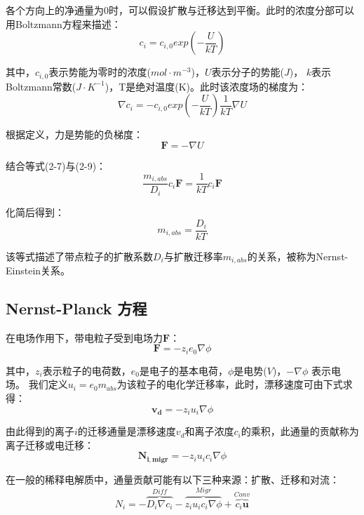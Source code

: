 各个方向上的净通量为$0$时，可以假设扩散与迁移达到平衡。此时的浓度分部可以用Boltzmann方程来描述：
\begin{equation}
    c_i=c_{i,0}exp(-\frac{U}{kT})
\end{equation}

其中，$c_{i,0}$表示势能为零时的浓度($mol\cdot{m^{-3}}$)，$U$表示分子的势能($J$)，
$k$表示Boltzmann常数($J\cdot{K^{-1}}$)，T是绝对温度(K)。此时该浓度场的梯度为：
\begin{equation}
    \nabla{c_i}=-c_{i,0}exp(-\frac{U}{kT})\frac{1}{kT}\nabla{U}
\end{equation}

根据定义，力是势能的负梯度：
\begin{equation}
    \mathbf{F}=-\nabla{U}
\end{equation}

结合等式(2-7)与(2-9)：
\begin{equation}
    \frac{m_{i,abs}}{D_i}c_i\mathbf{F}=\frac{1}{kT}c_i\mathbf{F}
\end{equation}

化简后得到：
\begin{equation}
    m_{i,abs}=\frac{D_i}{kT}
\end{equation}

该等式描述了带点粒子的扩散系数$D_i$与扩散迁移率$m_{i,abs}$的关系，被称为Nernst-Einstein关系。\cite{Mehrer2007,CONWAY1972250}
\subsection{Nernst-Planck 方程}
在电场作用下，带电粒子受到电场力$\mathbf{F}$：
\begin{equation}
    \mathbf{F}=-z_ie_0\nabla\phi
\end{equation}

其中，$z_i$表示粒子的电荷数，$e_0$是电子的基本电荷，$\phi$是电势($V$)，$−\nabla{\phi}$ 表示电场。
我们定义$u_i=e_0m_{abs}$为该粒子的电化学迁移率，此时，漂移速度可由下式求得：
\begin{equation}
   \mathbf{v_d}=-z_iu_i\nabla\phi
\end{equation}

由此得到的离子$i$的迁移通量是漂移速度$v_d$和离子浓度$c_i$的乘积，此通量的贡献称为离子迁移或电迁移：
\begin{equation}
    \mathbf{N_{i,migr}}=-z_iu_ic_i\nabla\phi
\end{equation}

在一般的稀释电解质中，通量贡献可能有以下三种来源：扩散、迁移和对流：
\begin{equation}
    N_i=-\overbrace{D_i\nabla{c_i}}^{Diff}-\overbrace{z_iu_ic_i\nabla\phi}^{Migr}+\overbrace{c_i\mathbf{u}}^{Conv}
\end{equation}

